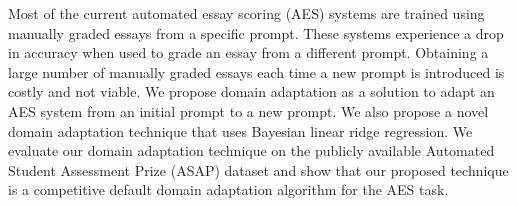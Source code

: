 Most of the current automated essay scoring (AES) systems are trained using manually graded essays from a specific prompt.  These systems experience a drop in accuracy when used to grade an essay from a different prompt.  Obtaining a large number of manually graded essays each time a new prompt is introduced is costly and not viable.              We propose domain adaptation as a solution to adapt an AES system from an initial prompt to a new prompt.  We also propose a novel domain adaptation technique that uses Bayesian linear ridge regression.  We evaluate our domain adaptation technique on the publicly available Automated Student Assessment Prize (ASAP) dataset and show that our proposed technique is a competitive default domain adaptation algorithm for the AES task.
